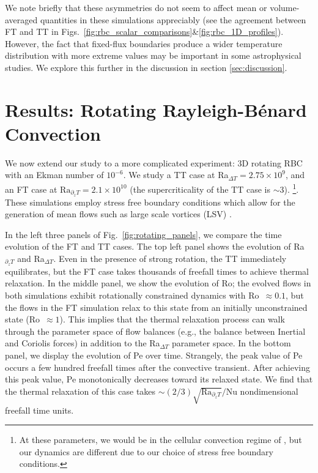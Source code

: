 \documentclass[aps, pre, onecolumn, nofootinbib, notitlepage, groupedaddress, amsfonts, amssymb, amsmath, longbibliography, superscriptaddress]{revtex4-1}
\newcommand{\RB}{Rayleigh-B\'{e}nard }
\newcommand{\ea}[1]{{\color{red} #1}}
\begin{document}
We note briefly that these asymmetries do not seem to affect mean or volume-averaged quantities in these simulations appreciably (see the agreement between FT and TT in Figs.~\ref{fig:rbc_scalar_comparisons}\&\ref{fig:rbc_1D_profiles}).
However, the fact that fixed-flux boundaries produce a wider temperature distribution with more extreme values may be important in some astrophysical studies.
We explore this further in the discussion in section \ref{sec:discussion}.





\section{Results: Rotating \RB Convection}
\label{sec:results_rotating}

We now extend our study to a more complicated experiment: 3D rotating RBC with an Ekman number of $10^{-6}$.
We study a TT case at Ra$_{\Delta T} = 2.75\times 10^9$, and an FT case at $\text{Ra}_{\partial_z T} = 2.1 \times 10^{10}$ (the supercriticality of the TT case is $\sim 3$).
\footnote{\ea{At these parameters, we would be in the cellular convection regime of \citet{stellmach&all2014}, but our dynamics are different due to our choice of stress free boundary conditions.
}}.
These simulations employ stress free boundary conditions which allow for the generation of mean flows such as large scale vortices (LSV) \ea{\citep{stellmach&all2014, rubio&all2014, guervilly&all2014, guervilly&hughes2017, favier&all2014, favier&all2019, couston&all2019}}.

In the left three panels of Fig.~\ref{fig:rotating_panels}, we compare the time evolution of the FT and TT cases.
The top left panel shows the evolution of Ra$_{\partial_z T}$ and Ra$_{\Delta T}$.
Even in the presence of strong rotation, the TT immediately equilibrates, but the FT case takes thousands of freefall times to achieve thermal relaxation.
In the middle panel, we show the evolution of Ro; the evolved flows in both simulations exhibit rotationally constrained dynamics with Ro $\,\approx 0.1$, but the flows in the FT simulation relax to this state from an initially unconstrained state (Ro $\,\approx 1$).
This implies that the thermal relaxation process can walk through the parameter space of flow balances (e.g., the balance between Inertial and Coriolis forces) in addition to the Ra$_{\Delta T}$ parameter space.
In the bottom panel, we display the evolution of Pe over time.
Strangely, the peak value of Pe occurs a few hundred freefall times after the convective transient.
After achieving this peak value, Pe monotonically decreases toward its relaxed state.
\ea{We find that the thermal relaxation of this case takes $\sim (2/3)\sqrt{\text{Ra}_{\partial_z T}}/\text{Nu}$ nondimensional freefall time units.}
\end{document}
